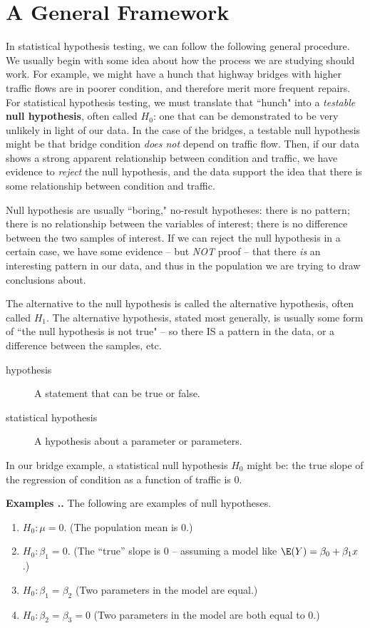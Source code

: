 \documentclass[twoside]{book}\usepackage[]{graphicx}\usepackage[]{xcolor}
\newcounter{example}[section]
\newenvironment{examples}%
{\refstepcounter{example}%
\textbf{Examples \thesection.\arabic{example}. }}%
{}
\begin{document}
\section{A General Framework}
In statistical hypothesis testing, we can follow the following general procedure.  We usually begin with some idea about how the process we are studying should work.  For example, we might have a hunch that highway bridges with higher traffic flows are in poorer condition, and therefore merit more frequent repairs.  For statistical hypothesis testing, we must translate that ``hunch" into a \emph{testable} \textbf{null hypothesis}, often called $H_0$:  one that can be demonstrated to be very unlikely in light of our data.  In the case of the bridges, a testable null hypothesis might be that bridge condition \emph{does not} depend on traffic flow.  Then, if our data shows a strong apparent relationship between condition and traffic, we have evidence to \emph{reject} the null hypothesis, and the data support the idea that there is some relationship between condition and traffic.

Null hypothesis are usually ``boring," no-result hypotheses:  there is no pattern; there is no relationship between the variables of interest; there is no difference between the two samples of interest.  If we can reject the null hypothesis in a certain case, we have some evidence -- but \emph{NOT} proof -- that there \emph{is} an interesting pattern in our data, and thus in the population we are trying to draw conclusions about. 

The alternative to the null hypothesis is called the alternative hypothesis, often called $H_1$.  The alternative hypothesis, stated most generally, is usually some form of ``the null hypothesis is not true" -- so there IS a pattern in the data, or a difference between the samples, etc.

\begin{description}
	\item[hypothesis] A statement that can be true or false.
	\item[statistical hypothesis] A hypothesis about a parameter or parameters.
\end{description}

In our bridge example, a statistical null hypothesis $H_0$ might be: the true slope of the regression of condition as a function of traffic is 0.

\begin{examples}
	The following are examples of null hypotheses.
	\begin{enumerate}
		\item
			$H_0: \mu = 0$.  (The population mean is 0.)
		\item
			$H_0: \beta_1=0$.  (The ``true'' slope is 0 -- assuming a model like $\E(Y) = \beta_0 + \beta_1 x$.)  
		\item
			$H_0: \beta_1 = \beta_2$ (Two parameters in the model are equal.)
		\item
			$H_0: \beta_2 = \beta_3 = 0$ (Two parameters in the model are both equal to 0.)
	\end{enumerate}
\end{examples}
\end{document}
